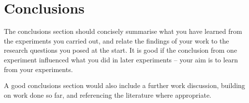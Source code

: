 \documentclass{article}
\begin{document}


\section{Conclusions}
\label{sec:concl}
The conclusions section should concisely summarise what you have learned from the experiments you carried out, and relate the findings of your work to the  research questions you posed at the start.   It is good if the conclusion from one experiment influenced what you did in later experiments -- your aim is to learn from your experiments.   

A good conclusions section would also include a further work discussion, building on work done so far, and referencing the literature where appropriate.


\end{document}
